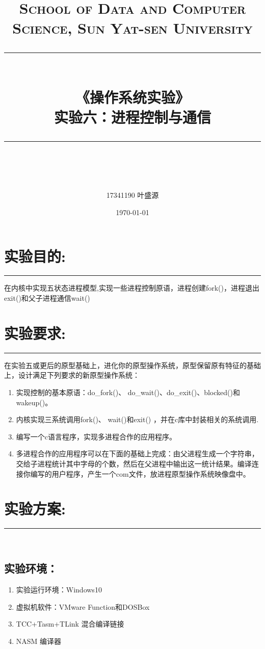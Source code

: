 \documentclass[UTF8]{article}
\title{	
\normalfont \normalsize
\textsc{School of Data and Computer Science, Sun Yat-sen University} \\ [25pt] %
\rule{\textwidth}{0.5pt} \\[0.4cm] %
{\LARGE\heiti\bfseries  《操作系统实验》}\\[0.5cm] %
{\huge\bfseries\heiti 实验六：进程控制与通信 } \\
\rule{\textwidth}{2pt} \\[0.5cm] %
\author{\Large17341190 叶盛源}
\date{\normalsize\today}
}
\begin{document}
\maketitle
\tableofcontents
\newpage
\heiti 

\section{实验目的:}
\noindent\rule[0.2\baselineskip]{\textwidth}{0.5pt}
在内核中实现五状态进程模型,实现一些进程控制原语，进程创建fork()，进程退出exit()和父子进程通信wait() 

\section{实验要求:}
\noindent\rule[0.2\baselineskip]{\textwidth}{0.5pt}
在实验五或更后的原型基础上，进化你的原型操作系统，原型保留原有特征的基础上，设计满足下列要求的新原型操作系统：
\begin{enumerate}[1)]%
\heiti 
\setlength{\itemsep}{0em}
	\item 实现控制的基本原语：do\_fork()、 do\_wait()、do\_exit()、blocked()和wakeup()。
	\item 内核实现三系统调用fork()、 wait()和exit() ，并在c库中封装相关的系统调用.
	\item 编写一个c语言程序，实现多进程合作的应用程序。
	\item 多进程合作的应用程序可以在下面的基础上完成：由父进程生成一个字符串，交给子进程统计其中字母的个数，然后在父进程中输出这一统计结果。编译连接你编写的用户程序，产生一个com文件，放进程原型操作系统映像盘中。
	\end{enumerate}


\section{实验方案:}
\noindent\rule[0.2\baselineskip]{\textwidth}{0.5pt}\\[-32pt]

\subsection{实验环境：}
\begin{enumerate}[1)]%
\heiti 
\setlength{\itemsep}{0em}
	\item 实验运行环境：Windows10
	\item 虚拟机软件：VMware Function和DOSBox
	\item TCC+Tasm+TLink 混合编译链接
	\item NASM 编译器
	\end{enumerate}
\end{document}
